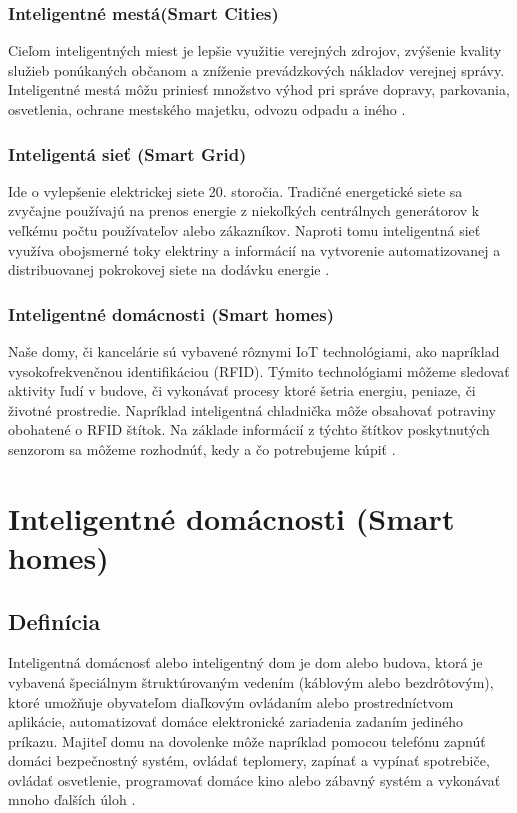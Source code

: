 \documentclass[twoside]{ctuthesis}
\theoremstyle{plain}
\theoremstyle{definition}
\theoremstyle{note}
\begin{document}
 \subsection{Inteligentné mestá(Smart Cities) }
	 Cieľom inteligentných miest je lepšie využitie verejných zdrojov, zvýšenie kvality služieb ponúkaných občanom a zníženie prevádzkových nákladov verejnej správy. Inteligentné mestá môžu priniesť množstvo výhod pri správe dopravy, parkovania, osvetlenia, ochrane mestského majetku, odvozu odpadu a iného \cite{smartcity}.  
	 
\subsection{ Inteligentá sieť (Smart Grid) }
 	Ide o vylepšenie elektrickej siete 20. storočia. Tradičné energetické siete sa zvyčajne používajú na prenos energie z niekoľkých centrálnych generátorov k veľkému počtu používateľov alebo zákazníkov. Naproti tomu inteligentná sieť využíva obojsmerné toky elektriny a informácií na vytvorenie automatizovanej a distribuovanej pokrokovej siete na dodávku energie \cite{smartgrid}.
\subsection{Inteligentné domácnosti (Smart homes) }
 	Naše domy, či kancelárie sú vybavené rôznymi IoT technológiami, ako napríklad vysokofrekvenčnou identifikáciou (RFID). Týmito technológiami môžeme sledovať aktivity ľudí v budove, či vykonávať procesy ktoré šetria energiu, peniaze, či životné prostredie. Napríklad inteligentná chladnička môže obsahovať potraviny obohatené o RFID štítok. Na základe informácií z týchto štítkov poskytnutých senzorom sa môžeme rozhodnúť, kedy a čo potrebujeme kúpiť \cite{trends}.   
	
\chapter{Inteligentné domácnosti (Smart homes)}
\section{Definícia}
Inteligentná domácnosť alebo inteligentný dom je dom alebo budova, ktorá je vybavená špeciálnym štruktúrovaným vedením (káblovým alebo bezdrôtovým), ktoré umožňuje obyvateľom diaľkovým ovládaním alebo prostredníctvom aplikácie, automatizovať domáce elektronické zariadenia zadaním jediného príkazu. Majiteľ domu na dovolenke môže napríklad pomocou telefónu zapnúť domáci bezpečnostný systém, ovládať teplomery, zapínať a vypínať spotrebiče, ovládať osvetlenie, programovať domáce kino alebo zábavný systém a vykonávať mnoho ďalších úloh \cite{homedef}.
\end{document}
